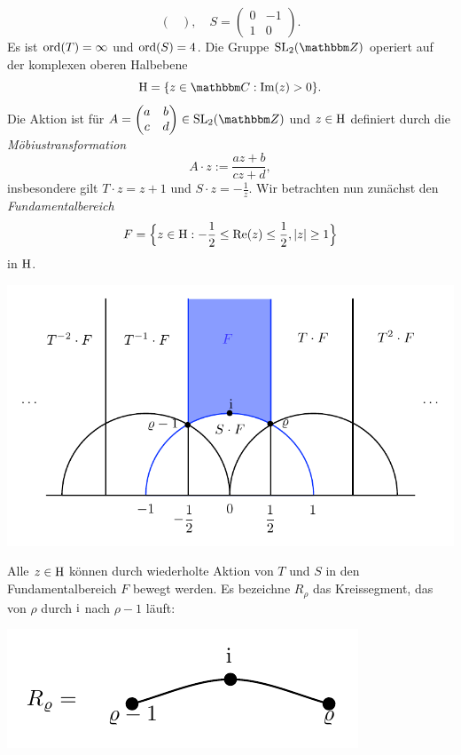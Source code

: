\documentclass[a4paper, 12pt, twoside]{article}
\begin{document}
\begin{enumerate}
\[\begin{pmatrix}
\end{pmatrix},\quad
S=\begin{pmatrix}
0 & -1 \\ 1 & 0
\end{pmatrix}.
\]
Es ist $\mathrm{ord}(T)=\infty$ und $\mathrm{ord}(S)=4$.
Die Gruppe $\SL_2(\ZZ)$ operiert auf der komplexen oberen Halbebene
\[
\hh = \{ z\in\CC : \Im(z) > 0 \}.
\]
Die Aktion ist für
$A=\begin{pmatrix} a&b \\ c&d \end{pmatrix}\in \SL_2(\ZZ)$
und $z\in \mathrm{H}$ definiert durch die \emph{Möbiustransformation}
\[
A\cdot z := \frac{az+b}{cz+d},
\]
insbesondere gilt $T\cdot z= z+1$ und $S\cdot z=-\frac{1}{z}$.
Wir betrachten nun zunächst den \emph{Fundamentalbereich}
\[
F = \Bigl\{ z\in \mathrm{H} : -\frac{1}{2}\leq \mathrm{Re}(z) \leq \frac{1}{2},
|z| \geq 1 \Bigr\}
\]
in $\mathrm{H}$.
\begin{center}
	\includegraphics{grugraImages/fundbereich}
\end{center}
Alle $z\in \mathrm{H}$ können durch wiederholte Aktion von $T$ und $S$
in den Fundamentalbereich $F$ bewegt werden.
Es bezeichne $R_{\rho}$ das Kreissegment, das von
$\rho$ durch $\mathrm{i}$ nach $\rho-1$ läuft:
\begin{center}
	\includegraphics{grugraImages/rho}
\end{center}

\end{enumerate}
\end{document}
